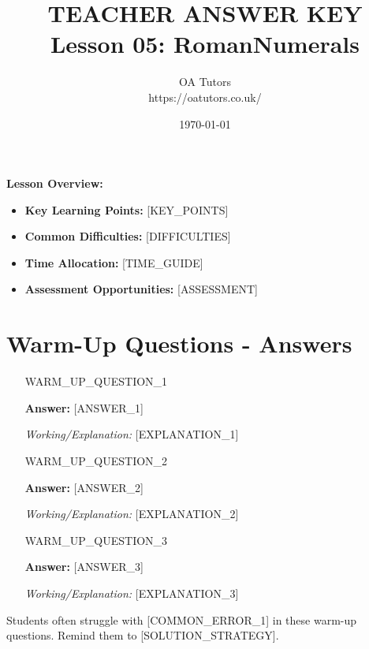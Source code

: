 \documentclass[a4paper,12pt]{article}
\begin{document}
\title{\textcolor{oared}{\Huge TEACHER ANSWER KEY} \\ 
       \textcolor{oablue}{\Large Lesson 05: RomanNumerals}}
\author{\textcolor{oablue}{OA Tutors} \\ 
        \textcolor{oagray}{https://oatutors.co.uk/}}
\date{\textcolor{oagray}{\today}}

\maketitle

\begin{teachingtip}
\textbf{Lesson Overview:}
\begin{itemize}
    \item \textbf{Key Learning Points:} [KEY_POINTS]
    \item \textbf{Common Difficulties:} [DIFFICULTIES]
    \item \textbf{Time Allocation:} [TIME_GUIDE]
    \item \textbf{Assessment Opportunities:} [ASSESSMENT]
\end{itemize}
\end{teachingtip}

\section{Warm-Up Questions - Answers}

\begin{enumerate}
    \item [WARM_UP_QUESTION_1]
    
    \textcolor{oared}{\textbf{Answer:} [ANSWER_1]}
    
    \textit{Working/Explanation:} [EXPLANATION_1]
    
    \item [WARM_UP_QUESTION_2]
    
    \textcolor{oared}{\textbf{Answer:} [ANSWER_2]}
    
    \textit{Working/Explanation:} [EXPLANATION_2]
    
    \item [WARM_UP_QUESTION_3]
    
    \textcolor{oared}{\textbf{Answer:} [ANSWER_3]}
    
    \textit{Working/Explanation:} [EXPLANATION_3]
\end{enumerate}

\begin{commonerror}
Students often struggle with [COMMON_ERROR_1] in these warm-up questions. 
Remind them to [SOLUTION_STRATEGY].
\end{commonerror}
\end{document}
